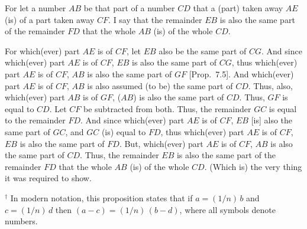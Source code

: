 \begin{Parallel}{}{}
{For let a number $AB$ be that part of a number $CD$  that a (part) taken away $AE$ (is) of a part taken away $CF$. I say that the remainder $EB$ is also the
same part of the remainder $FD$ that the whole $AB$ (is) of the whole $CD$.

For which(ever) part $AE$ is of $CF$, let $EB$ also be the same part of $CG$.
And since which(ever) part $AE$ is of $CF$, $EB$ is also the same part
of $CG$, thus which(ever) part $AE$ is of $CF$, $AB$ is also the same part of
$GF$ [Prop.~7.5]. And which(ever) part $AE$ is of $CF$, $AB$ is also assumed (to be)
the same part of $CD$. Thus, also, which(ever) part $AB$ is of $GF$, ($AB$) is also
the same part of $CD$. Thus, $GF$ is equal to $CD$. Let $CF$ be subtracted from
both. Thus, the remainder $GC$ is equal to the remainder $FD$. And since
which(ever) part $AE$ is of $CF$, $EB$ [is] also the same part of $GC$, and $GC$ (is)
equal to $FD$, thus which(ever) part $AE$ is of $CF$, $EB$ is also the same part of
$FD$.
 But, 
which(ever) part $AE$ is of $CF$, $AB$ is also the same part of $CD$. Thus, the
remainder $EB$ is also the same part of the remainder $FD$ that
the whole $AB$ (is) of the whole $CD$. (Which is) the very thing it
was required to show.}
\end{Parallel}
{\footnotesize \noindent$^\dag$ In modern notation, this
proposition states that if $a=(1/n)\,b$ and $c=(1/n)\,d$ then $(a-c)=
(1/n)\,(b-d)$, where all symbols denote numbers.}

